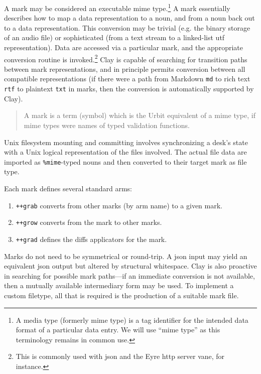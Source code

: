 \documentclass[twoside]{article}
\begin{document}
A mark may be considered an executable {\sc mime} type.\footnote{A media type (formerly {\sc mime} type) is a tag identifier for the intended data format of a particular data entry. We will use “{\sc mime} type” as this terminology remains in common use.}  A mark essentially describes how to map a data representation to a noun, and from a noun back out to a data representation.  This conversion may be trivial (e.g. the binary storage of an audio file) or sophisticated (from a text stream to a linked-list {\sc utf} representation).  Data are accessed via a particular mark, and the appropriate conversion routine is invoked.\footnote{This is commonly used with {\sc json} and the Eyre {\sc http} server vane, for instance.}  Clay is capable of searching for transition paths between mark representations, and in principle permits conversion between all compatible representations (if there were a path from Markdown \texttt{md} to rich text \texttt{rtf} to plaintext \texttt{txt} in marks, then the conversion is automatically supported by Clay).

\begin{quote}
  A mark is a term (symbol) which is the Urbit equivalent of a {\sc mime} type, if {\sc mime} types were names of typed validation functions.  \citep[p. 51]{Whitepaper}
\end{quote}

Unix filesystem mounting and committing involves synchronizing a desk's state with a Unix logical representation of the files involved.  The actual file data are imported as \lstinline[style=inlinecode]{%mime}-typed nouns and then converted to their target mark as file type.

Each mark defines several standard arms:

\begin{enumerate}
  \item  \lstinline[style=inlinecode]{++grab} converts from other marks (by arm name) to a given mark.
  \item  \lstinline[style=inlinecode]{++grow} converts from the mark to other marks.
  \item  \lstinline[style=inlinecode]{++grad} defines the diffs applicators for the mark.
\end{enumerate}

\noindent
Marks do not need to be symmetrical or round-trip.  A {\sc json} input may yield an equivalent {\sc json} output but altered by structural whitespace.  Clay is also proactive in searching for possible mark paths—if an immediate conversion is not available, then a mutually available intermediary form may be used.  To implement a custom filetype, all that is required is the production of a suitable mark file.
\end{document}
